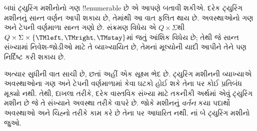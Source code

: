 \documentclass[../../../include/open-logic-section]{subfiles}
\begin{document}

\begin{explain}
બધાં ટ્યુરિંગ મશીનોનો ગણ !!{enumerable} છે એ આપણે બતાવી શકીએ.
દરેક ટ્યુરિંગ મશીનનું સાન્ત વર્ણન આપી શકાય છે, તેમાંથી આ
વાત ફલિત થાય છે. અવસ્થાઓનો ગણ અને ટેપની વર્ણમાળા સાન્ત
ગણો છે. સંક્રમણ વિધેય એ $Q \times \Sigma$થી
$Q \times \Sigma \times \{\TMleft, \TMright, \TMstay\}$માં
જતું આંશિક વિધેય છે; તેથી જે સાન્ત સંખ્યામાં નિવેશ-જોડીઓ માટે તે
વ્યાખ્યાયિત છે, તેમનાં મૂલ્યોની યાદી આપીને તેને પણ
નિર્દિષ્ટ કરી શકાય છે.

અત્યાર સુધીની વાત સાચી છે, છતાં અહીં એક સૂક્ષ્મ ભેદ છે.
ટ્યુરિંગ મશીનની વ્યાખ્યાએ અવસ્થાઓના ગણ અને ટેપની
વર્ણમાળામાં કેવા ઘટકો હોઈ શકે તેના પર કોઈ
પ્રતિબંધ મૂક્યો નથી. તેથી, દાખલા તરીકે, દરેક વાસ્તવિક
સંખ્યા માટે તકનીકી અર્થમાં એવું ટ્યુરિંગ મશીન છે જે તે
સંખ્યાને અવસ્થા તરીકે વાપરે છે. જોકે મશીનનું \emph{વર્તન}
કયા પદાર્થો અવસ્થાઓ અને ચિહ્નો તરીકે કામ કરે છે તેના પર
આધારિત નથી. નાં બે ટ્યુરિંગ મશીનો જુઓ.
\begin{figure}
\begin{center}
\\
\end{center}
\end{figure}
\end{explain}
\end{document}
